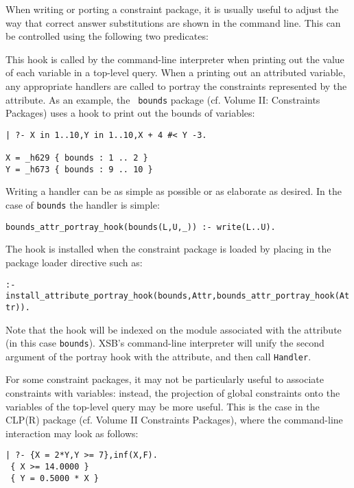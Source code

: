 When writing or porting a constraint package, it is usually useful to
adjust the way that correct answer substitutions are shown in the
command line.  This can be controlled using the following two predicates:

\begin{description}

%
This hook is called by the command-line interpreter when printing out
the value of each variable in a top-level query.  When a printing out
an attributed variable, any appropriate handlers are called to portray
the constraints represented by the attribute.  As an example, the {\tt
  bounds} package (cf. Volume II: Constraints Packages) uses a hook to
print out the bounds of variables:
%
\begin{small}
\begin{verbatim}
| ?- X in 1..10,Y in 1..10,X + 4 #< Y -3.

X = _h629 { bounds : 1 .. 2 }
Y = _h673 { bounds : 9 .. 10 }
\end{verbatim}
\end{small}
%
Writing a handler can be as simple as possible or as elaborate as
desired.  In the case of {\tt bounds} the handler is simple:

{\small
{\tt bounds\_attr\_portray\_hook(bounds(L,U,\_)) :- write(L..U).}
}

The hook is installed when the constraint package is loaded by placing
in the package loader directive such as:

{\small
{\tt  :- install\_attribute\_portray\_hook(bounds,Attr,bounds\_attr\_portray\_hook(Attr)).}
}

Note that the hook will be indexed on the module associated with the
attribute (in this case {\tt bounds}).  XSB's command-line interpreter
will unify the second argument of the portray hook with the attribute,
and then call {\tt Handler}.

%
For some constraint packages, it may not be particularly useful to
associate constraints with variables: instead, the projection of
global constraints onto the variables of the top-level query may be
more useful.  This is the case in the CLP(R) package (cf. Volume II
Constraints Packages), where the command-line interaction may look as
follows:
%
{\small
\begin{verbatim}
| ?- {X = 2*Y,Y >= 7},inf(X,F).
 { X >= 14.0000 }
 { Y = 0.5000 * X }


\end{verbatim}}
\end{description}
